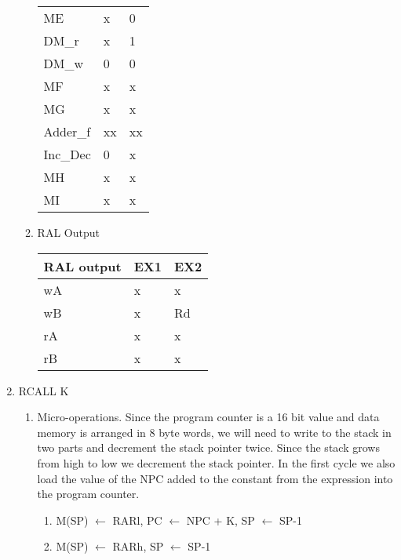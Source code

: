 \documentclass[12pt,letterpaper]{article}
\begin{document}
\begin{enumerate}
\begin{enumerate}
\begin{tabular}{l l l}
                 ME & x & 0 \\
                 DM\_r & x & 1 \\
                 DM\_w & 0 & 0 \\
                 MF & x & x \\
                 MG & x & x \\
                 Adder\_f & xx & xx \\
                 Inc\_Dec & 0 & x \\
                 MH & x & x \\
                 MI & x & x \\
            \end{tabular}

        \item RAL Output\\
            \begin{tabular}{l l l}
                 RAL output & EX1 & EX2 \\
                 \hline
                 wA & x & x \\
                 wB & x & Rd \\
                 rA & x & x \\
                 rB & x & x \\
            \end{tabular}
        \end{enumerate}




    \item RCALL K
    \begin{enumerate}
        \item Micro-operations. Since the program counter is a 16 bit value and data memory is arranged in 8 byte words, we will need to write to the stack in two parts and decrement the stack pointer twice. Since the stack grows from high to low we decrement the stack pointer. In the first cycle we also load the value of the NPC added to the constant from the expression into the program counter.\\
        \begin{enumerate}[i]
            \item M(SP) $\leftarrow$ RARl, PC $\leftarrow$ NPC + K, SP $\leftarrow$ SP-1
            \item M(SP) $\leftarrow$ RARh, SP $\leftarrow$ SP-1
        \end{enumerate}


\end{enumerate}
\end{enumerate}
\end{document}
